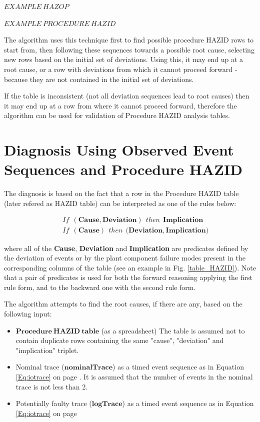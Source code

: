 \documentclass[conference]{IEEEtran}
\begin{document}
$EXAMPLE~HAZOP$

$EXAMPLE~PROCEDURE~HAZID$

The algorithm uses this technique first to find possible procedure HAZID rows to start from, then following these sequences towards a possible root cause, selecting new rows based on the initial set of deviations. Using this, it may end up at a root cause, or a row with deviations from which it cannot proceed forward - because they are not contained in the initial set of deviations. 

If the table is inconsistent (not all deviation sequences lead to root causes) then it may end up at a row from where it cannot proceed forward, therefore the algorithm can be used for validation of Procedure HAZID analysis tables.

%
\section{Diagnosis Using Observed Event Sequences and Procedure HAZID}
\label{sec:reasoning}

The diagnosis is based on the fact that a row in the Procedure HAZID 
table (later refered as HAZID table) can be interpreted as one of the rules below:
\begin{small}
\begin{eqnarray*}
&& If~~\mathbf{(Cause,Deviation)}~~then~~\mathbf{Implication} \\
&& If~~\mathbf{(Cause)}~~then~~\mathbf{(Deviation,Implication})
\end{eqnarray*}
\end{small}
\noindent where all of the \textbf{Cause}, \textbf{Deviation} and \textbf{Implication}
 are predicates
 defined by the deviation of events or by the plant component failure modes
present in the corresponding columns of the table (see an example in Fig. \ref{table_HAZID}).
Note that a pair of predicates is used for both the forward reasoning
 applying the first rule form, and to the backward one with the second rule form.

 
The algorithm attempts to find the root causes, if there are any, based on the following input:
\begin{itemize}
	\item $\mathbf{Procedure~HAZID~table}$ (as a spreadsheet) The table is assumed not to contain duplicate rows containing the same "cause", "deviation" and "implication" triplet.
	\item Nominal trace ($\mathbf{nominalTrace}$) as a timed event sequence as in Equation \ref{Eq:iotrace} on page \pageref{Eq:iotrace}. It is assumed that the number of events in the nominal trace is not less than 2.
	\item Potentially faulty trace ($\mathbf{logTrace}$) as a timed event sequence as in Equation \ref{Eq:iotrace} on page \pageref{Eq:iotrace}
\end{itemize}
\end{document}
